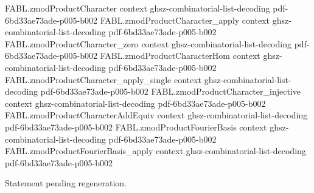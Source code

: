 \begin{theorem}
  {FABL.zmodProductCharacter}
  {context}
  {ghsz-combinatorial-list-decoding}
  {pdf-6bd33ae73ade-p005-b002}
\proofstep
  {FABL.zmodProductCharacter_apply}
  {context}
  {ghsz-combinatorial-list-decoding}
  {pdf-6bd33ae73ade-p005-b002}
\proofstep
  {FABL.zmodProductCharacter_zero}
  {context}
  {ghsz-combinatorial-list-decoding}
  {pdf-6bd33ae73ade-p005-b002}
\proofstep
  {FABL.zmodProductCharacterHom}
  {context}
  {ghsz-combinatorial-list-decoding}
  {pdf-6bd33ae73ade-p005-b002}
\proofstep
  {FABL.zmodProductCharacter_apply_single}
  {context}
  {ghsz-combinatorial-list-decoding}
  {pdf-6bd33ae73ade-p005-b002}
\proofstep
  {FABL.zmodProductCharacter_injective}
  {context}
  {ghsz-combinatorial-list-decoding}
  {pdf-6bd33ae73ade-p005-b002}
\proofstep
  {FABL.zmodProductCharacterAddEquiv}
  {context}
  {ghsz-combinatorial-list-decoding}
  {pdf-6bd33ae73ade-p005-b002}
\proofstep
  {FABL.zmodProductFourierBasis}
  {context}
  {ghsz-combinatorial-list-decoding}
  {pdf-6bd33ae73ade-p005-b002}
\proofstep
  {FABL.zmodProductFourierBasis_apply}
  {context}
  {ghsz-combinatorial-list-decoding}
  {pdf-6bd33ae73ade-p005-b002}

Statement pending regeneration.
\end{theorem}

